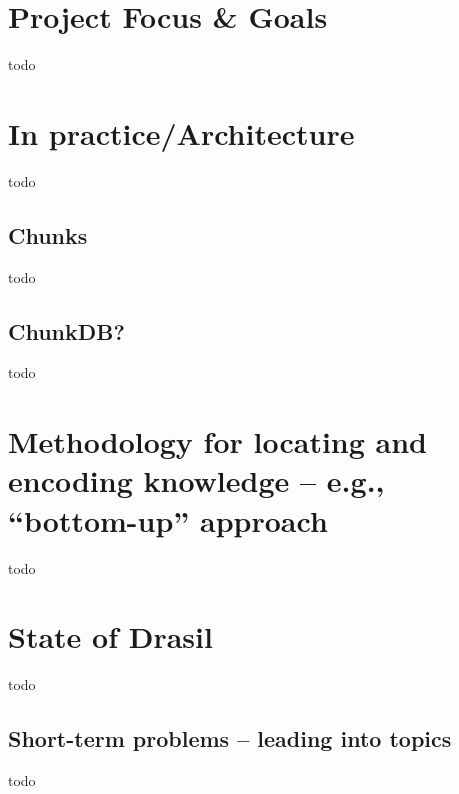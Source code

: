 \section{Project Focus \& Goals}
todo

\section{In practice/Architecture}
todo

\subsection{Chunks}
todo

\subsection{ChunkDB?}
todo

\section{Methodology for locating and encoding knowledge -- e.g., ``bottom-up'' approach}
todo

\section{State of Drasil}
todo

\subsection{Short-term problems -- leading into topics}
todo
